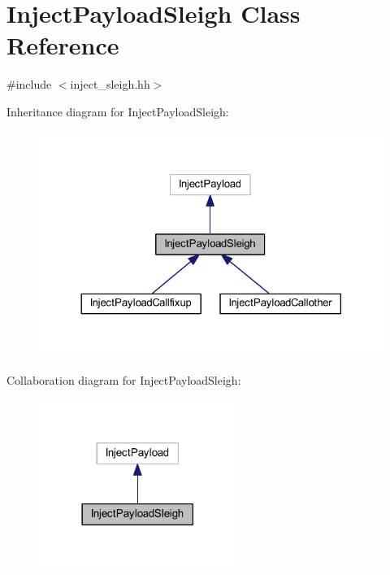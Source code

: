 \hypertarget{class_inject_payload_sleigh}{}\section{Inject\+Payload\+Sleigh Class Reference}
\label{class_inject_payload_sleigh}


{\ttfamily \#include $<$inject\+\_\+sleigh.\+hh$>$}



Inheritance diagram for Inject\+Payload\+Sleigh\+:
\nopagebreak
\begin{figure}[H]
\begin{center}
\leavevmode
\includegraphics[width=324pt]{class_inject_payload_sleigh__inherit__graph}
\end{center}
\end{figure}


Collaboration diagram for Inject\+Payload\+Sleigh\+:
\nopagebreak
\begin{figure}[H]
\begin{center}
\leavevmode
\includegraphics[width=182pt]{class_inject_payload_sleigh__coll__graph}
\end{center}
\end{figure}
